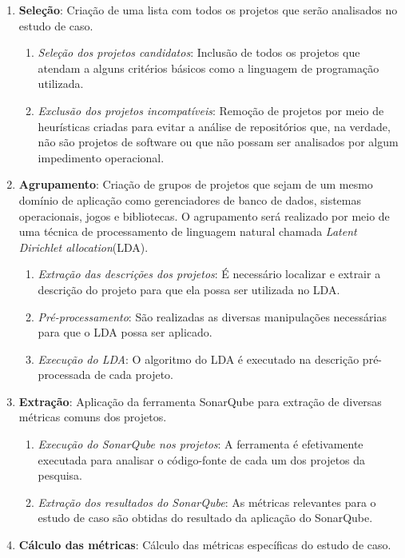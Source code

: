 \begin{enumerate}
\item \textbf{Seleção}: Criação de uma lista com todos os projetos que serão analisados no estudo de caso.
   \begin{enumerate}
      \item \textit{Seleção dos projetos candidatos}: Inclusão de todos os projetos que atendam a alguns critérios básicos como a linguagem de programação utilizada.
      \item \textit{Exclusão dos projetos incompatíveis}: Remoção de projetos por meio de heurísticas criadas para evitar a análise de repositórios que, na verdade, não são projetos de software ou que não possam ser analisados por algum impedimento operacional.
   \end{enumerate}
\item \textbf{Agrupamento}: Criação de grupos de projetos que sejam de um mesmo domínio de aplicação como gerenciadores de banco de dados, sistemas operacionais, jogos e bibliotecas. O agrupamento será realizado por meio de uma técnica de processamento de linguagem natural chamada \textit{Latent Dirichlet allocation}(LDA)\cite{blei2002latent}.
   \begin{enumerate}
      \item \textit{Extração das descrições dos projetos}: É necessário localizar e extrair a descrição do projeto para que ela possa ser utilizada no LDA.
      \item \textit{Pré-processamento}: São realizadas as diversas manipulações necessárias para que o LDA possa ser aplicado.
      \item \textit{Execução do LDA}: O algoritmo do LDA é executado na descrição pré-processada de cada projeto.
   \end{enumerate}
\item \textbf{Extração}: Aplicação da ferramenta SonarQube\cite{campbell2013sonarqube} para extração de diversas métricas comuns dos projetos.
  \begin{enumerate}
      \item \textit{Execução do SonarQube nos projetos}: A ferramenta é efetivamente executada para analisar o código-fonte de cada um dos projetos da pesquisa.
      \item \textit{Extração dos resultados do SonarQube}: As métricas relevantes para o estudo de caso são obtidas do resultado da aplicação do SonarQube.
   \end{enumerate}
\item \textbf{Cálculo das métricas}: Cálculo das métricas específicas do estudo de caso.

\end{enumerate}

